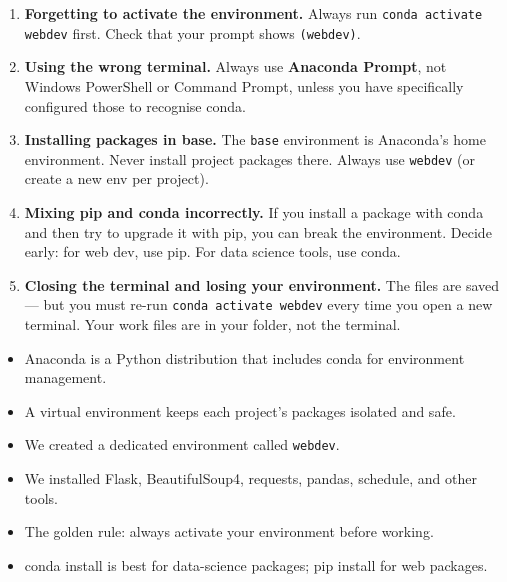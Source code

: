 \documentclass[12pt, a4paper]{book}
\begin{document}
\begin{enumerate}[leftmargin=1.5em]
  \item \textbf{Forgetting to activate the environment.}
    Always run \texttt{conda activate webdev} first. Check that your prompt shows \texttt{(webdev)}.

  \item \textbf{Using the wrong terminal.}
    Always use \textbf{Anaconda Prompt}, not Windows PowerShell or Command Prompt,
    unless you have specifically configured those to recognise conda.

  \item \textbf{Installing packages in base.}
    The \texttt{base} environment is Anaconda's home environment. Never install
    project packages there. Always use \texttt{webdev} (or create a new env per project).

  \item \textbf{Mixing pip and conda incorrectly.}
    If you install a package with conda and then try to upgrade it with pip,
    you can break the environment. Decide early: for web dev, use pip.
    For data science tools, use conda.

  \item \textbf{Closing the terminal and losing your environment.}
    The files are saved --- but you must re-run \texttt{conda activate webdev}
    every time you open a new terminal. Your work files are in your folder, not the terminal.
\end{enumerate}

\begin{tcolorbox}[learnedbox]
\begin{itemize}
  \item Anaconda is a Python distribution that includes conda for environment management.
  \item A virtual environment keeps each project's packages isolated and safe.
  \item We created a dedicated environment called \texttt{webdev}.
  \item We installed Flask, BeautifulSoup4, requests, pandas, schedule, and other tools.
  \item The golden rule: always activate your environment before working.
  \item conda install is best for data-science packages; pip install for web packages.
\end{itemize}
\end{tcolorbox}
\end{document}
